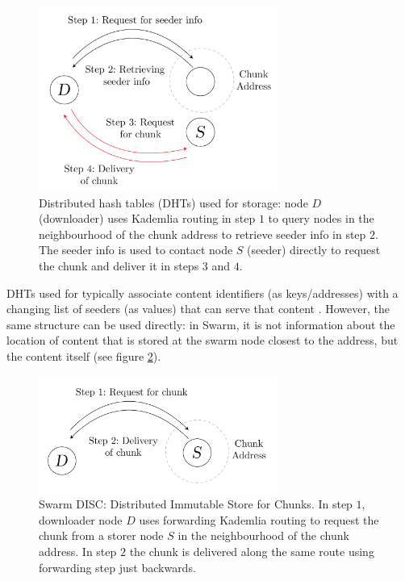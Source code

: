 \begin{figure}[htbp]
   \centering
   \includegraphics[width=0.7\textwidth]{fig/dht.pdf}
   \caption[Distributed hash tables (DHTs) \statusgreen]{Distributed hash tables (DHTs) used for storage:  node $D$ (downloader) uses Kademlia routing in step $1$ to query nodes in the neighbourhood of the chunk address to retrieve seeder info in step $2$. The seeder info is used to contact node $S$ (seeder) directly to request the chunk and deliver it in steps $3$ and $4$.}
   \label{fig:DHT}
\end{figure}

DHTs used for  typically associate content identifiers (as keys/addresses) with a changing list of seeders (as values) that can serve that content \cite{ipfs2014, crosby2007analysis}. However, the same structure can be used directly: in Swarm, it is not information about the location of content that is stored at the swarm node closest to the address, but the content itself (see figure \ref{fig:disc}). 


\begin{figure}[htbp]
   \centering
   \includegraphics[width=0.7\textwidth]{fig/disc.pdf}
   \caption[Swarm DISC: Distributed Immutable Store for Chunks \statusgreen]{Swarm DISC:  Distributed Immutable Store for Chunks. In step $1$, downloader node $D$ uses forwarding Kademlia routing to request the chunk from a storer node $S$ in the neighbourhood of the chunk address. In step $2$ the chunk is delivered along the same route using forwarding step just backwards.   }
   \label{fig:disc}
\end{figure}

